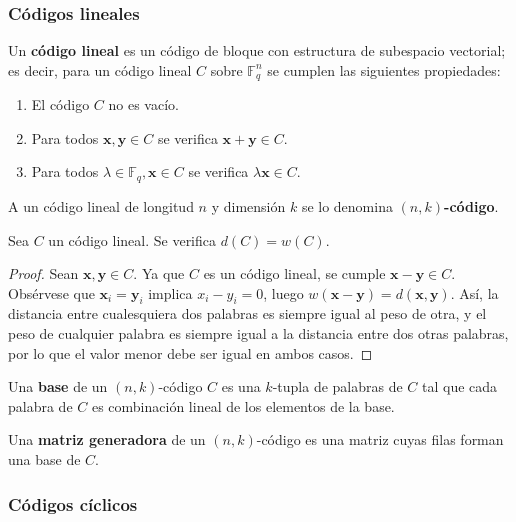 \subsubsection{Códigos lineales}

\begin{definition}
	Un \textbf{código lineal} es un código de bloque con estructura de subespacio vectorial; es decir, para un código lineal $C$ sobre $\mathbb{F}_q^n$ se cumplen las siguientes propiedades:
	\begin{enumerate}
		\item El código $C$ no es vacío.
		\item Para todos $\textbf{x}, \textbf{y} \in C$ se verifica $\textbf{x} + \textbf{y} \in C$.
		\item Para todos $\lambda \in \mathbb{F}_q, \textbf{x} \in C$ se verifica $\lambda\textbf{x} \in C$.
	\end{enumerate}

	A un código lineal de longitud $n$ y dimensión $k$ se lo denomina \textbf{$(n, k)$-código}.
\end{definition}

\begin{theorem}
	Sea $C$ un código lineal. Se verifica $d(C) = w(C)$.
\end{theorem}

\begin{proof}
	Sean $\textbf{x}, \textbf{y} \in C$. Ya que $C$ es un código lineal, se cumple $\textbf{x} - \textbf{y} \in C$. Obsérvese que $\textbf{x}_i = \textbf{y}_i$ implica $x_i - y_i = 0$, luego $w(\textbf{x} - \textbf{y}) = d(\textbf{x}, \textbf{y})$. Así, la distancia entre cualesquiera dos palabras es siempre igual al peso de otra, y el peso de cualquier palabra es siempre igual a la distancia entre dos otras palabras, por lo que el valor menor debe ser igual en ambos casos.
\end{proof}

\begin{definition}
	Una \textbf{base} de un $(n, k)$-código $C$ es una $k$-tupla de palabras de $C$ tal que cada palabra de $C$ es combinación lineal de los elementos de la base.
\end{definition}

\begin{definition}
	Una \textbf{matriz generadora} de un $(n, k)$-código es una matriz cuyas filas forman una base de $C$.
\end{definition}

\subsubsection{Códigos cíclicos}

